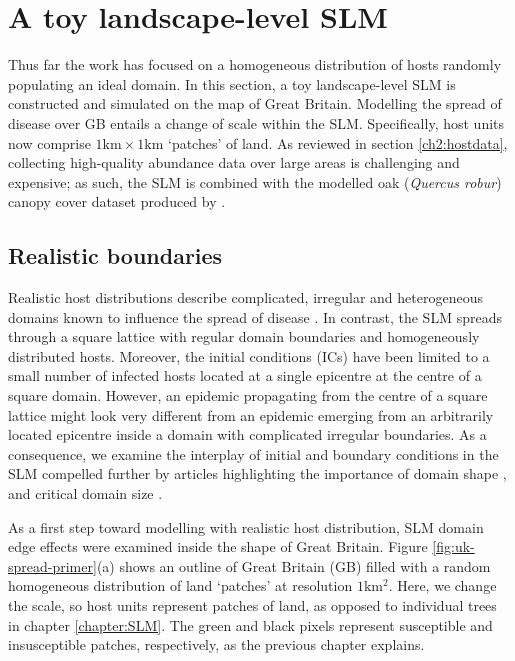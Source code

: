 \section{A toy landscape-level SLM}

Thus far the work has focused on a homogeneous distribution of hosts randomly populating an ideal domain. 
In this section, a toy landscape-level SLM is constructed and simulated on the map of Great Britain.
Modelling the spread of disease over GB entails a change of scale within the SLM. 
Specifically, host units now comprise $\mathrm{1km \times 1km}$ `patches' of land.
As reviewed in section \ref{ch2:hostdata}, 
collecting high-quality abundance data over large areas is challenging and expensive; 
as such, the SLM is combined with the modelled oak (\textit{Quercus robur}) canopy cover dataset produced by \cite{hill.data}.

\subsection{Realistic boundaries}

Realistic host distributions describe complicated, irregular and heterogeneous domains
known to influence the spread of disease \cite{madden1995plant}.
In contrast, the SLM spreads through a square lattice with regular domain boundaries and homogeneously distributed hosts.
Moreover, the initial conditions (ICs) have been limited to a small number of infected hosts
located at a single epicentre at the centre of a square domain.
However, an epidemic propagating from the centre of a square lattice might look very different
from an epidemic emerging from an arbitrarily located epicentre inside a domain with complicated irregular boundaries.
As a consequence, we examine the interplay of initial and boundary conditions in the SLM\textemdash
compelled further by articles highlighting the importance of domain shape \cite{mikaberidze2016invasiveness},
and critical domain size \cite{abad2020reaction, reimer2017critical}.

As a first step toward modelling with realistic host distribution,
SLM domain edge effects were examined inside the shape of Great Britain.
Figure \ref{fig:uk-spread-primer}(a) shows an outline of Great Britain (GB) filled 
with a random homogeneous distribution of land `patches' at resolution $1\mathrm{km^2}$. 
Here, we change the scale, so host units represent patches of land, 
as opposed to individual trees in chapter \ref{chapter:SLM}.
The green and black pixels represent susceptible and insusceptible patches, 
respectively, as the previous chapter explains.

